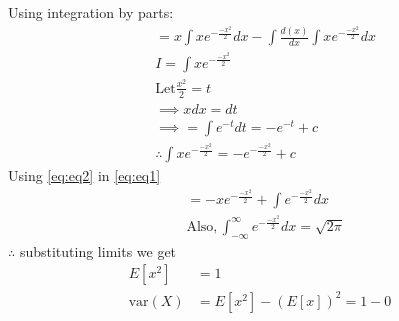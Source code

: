 \documentclass[journal,12pt,twocolumn]{IEEEtran}
\theoremstyle{remark}
\numberwithin{equation}{section}
\begin{document}
Using integration by parts:
  \begin{align}
   \label{eq:eq1}
 & =x\int xe^{-\frac{-x^2}{2}} dx-\int\frac{d(x)}{dx} \int xe^{-\frac{-x^2}{2}}dx\\
 &I=\int x e^{-\frac{-x^2}{2}}\\
 &\text{Let} \frac{x^2}{2}=t \\
 &\implies x dx=dt\\
 &\implies =\int e^{-t} dt=-e^{-t} +c\\
 \label{eq:eq2}
 &\therefore \int x e^{-\frac{-x^2}{2}}=-e^{-\frac{-x^2}{2}} +c
 \end{align}
 Using \eqref{eq:eq2} in \eqref{eq:eq1}
 \begin{align}
&= -x e^{-\frac{-x^2}{2}}+\int e^{-\frac{-x^2}{2}} dx\\
&\text{Also} ,\int_{-\infty}^{\infty} e^{-\frac{-x^2}{2}} dx=\sqrt{2 \pi} 
\end{align}
$\therefore$ substituting limits we get
\begin{align}
 E[x^2]&=1\\
 \text{var}(X)&=E[x^2]-(E[x])^2=1-0
\end{align}
 
\end{document}
